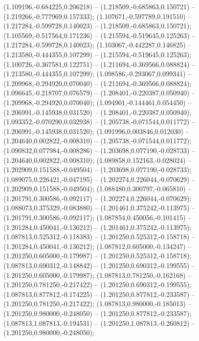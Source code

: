  (1.109196,-0.684225,0.206218) -- (1.218509,-0.685863,0.150721) -- (1.219266,-0.777969,0.157333);
 (1.107671,-0.597789,0.191510) -- (1.217284,-0.599728,0.140023) -- (1.218509,-0.685863,0.150721);
 (1.105569,-0.517564,0.171236) -- (1.215594,-0.519645,0.125263) -- (1.217284,-0.599728,0.140023);
 (1.103067,-0.442287,0.146825) -- (1.213580,-0.444355,0.107299) -- (1.215594,-0.519645,0.125263);
 (1.100726,-0.367581,0.122751) -- (1.211694,-0.369566,0.088824) -- (1.213580,-0.444355,0.107299);
 (1.098586,-0.293067,0.099341) -- (1.209968,-0.294920,0.070040) -- (1.211694,-0.369566,0.088824);
 (1.096645,-0.218707,0.076579) -- (1.208401,-0.220387,0.050940) -- (1.209968,-0.294920,0.070040);
 (1.094901,-0.144461,0.054450) -- (1.206991,-0.145938,0.031520) -- (1.208401,-0.220387,0.050940);
 (1.093352,-0.070290,0.032938) -- (1.205738,-0.071544,0.011772) -- (1.206991,-0.145938,0.031520);
 (1.091996,0.003846,0.012030) -- (1.204640,0.002822,-0.008310) -- (1.205738,-0.071544,0.011772);
 (1.090832,0.077984,-0.008286) -- (1.203698,0.077190,-0.028733) -- (1.204640,0.002822,-0.008310);
 (1.089858,0.152163,-0.028024) -- (1.202909,0.151588,-0.049504) -- (1.203698,0.077190,-0.028733);
 (1.089075,0.226421,-0.047195) -- (1.202274,0.226044,-0.070629) -- (1.202909,0.151588,-0.049504);
 (1.088480,0.300797,-0.065810) -- (1.201791,0.300586,-0.092117) -- (1.202274,0.226044,-0.070629);
 (1.088073,0.375329,-0.083880) -- (1.201461,0.375242,-0.113975) -- (1.201791,0.300586,-0.092117);
 (1.087854,0.450056,-0.101415) -- (1.201284,0.450041,-0.136212) -- (1.201461,0.375242,-0.113975);
 (1.087813,0.525312,-0.118383) -- (1.201250,0.525312,-0.158718) -- (1.201284,0.450041,-0.136212);
 (1.087812,0.605000,-0.134247) -- (1.201250,0.605000,-0.179987) -- (1.201250,0.525312,-0.158718);
 (1.087813,0.690312,-0.148842) -- (1.201250,0.690312,-0.199555) -- (1.201250,0.605000,-0.179987);
 (1.087813,0.781250,-0.162168) -- (1.201250,0.781250,-0.217422) -- (1.201250,0.690312,-0.199555);
 (1.087813,0.877812,-0.174225) -- (1.201250,0.877812,-0.233587) -- (1.201250,0.781250,-0.217422);
 (1.087813,0.980000,-0.185013) -- (1.201250,0.980000,-0.248050) -- (1.201250,0.877812,-0.233587);
 (1.087813,1.087813,-0.194531) -- (1.201250,1.087813,-0.260812) -- (1.201250,0.980000,-0.248050);
